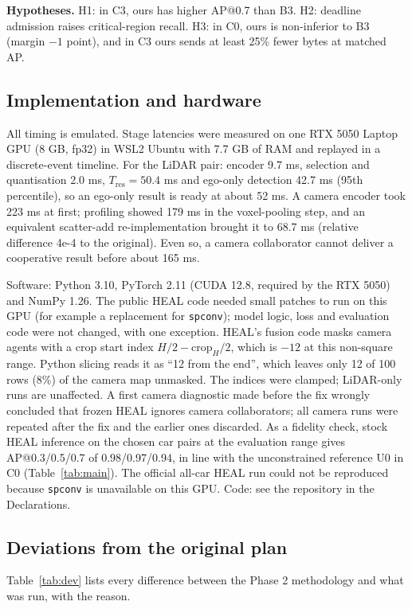 \documentclass[conference]{IEEEtran}
\begin{document}
\textbf{Hypotheses.} H1: in C3, ours has higher AP@0.7 than B3. H2: deadline admission raises critical-region recall. H3: in C0, ours is non-inferior to B3 (margin $-1$ point), and in C3 ours sends at least 25\% fewer bytes at matched AP.

\subsection{Implementation and hardware}\label{sec:timing}
All timing is emulated. Stage latencies were measured on one RTX 5050 Laptop GPU (8 GB, fp32) in WSL2 Ubuntu with 7.7 GB of RAM and replayed in a discrete-event timeline. For the LiDAR pair: encoder 9.7 ms, selection and quantisation 2.0 ms, $T_{\mathrm{res}}=50.4$ ms and ego-only detection 42.7 ms (95th percentile), so an ego-only result is ready at about 52 ms. A camera encoder took 223 ms at first; profiling showed 179 ms in the voxel-pooling step, and an equivalent scatter-add re-implementation brought it to 68.7 ms (relative difference 4e-4 to the original). Even so, a camera collaborator cannot deliver a cooperative result before about 165 ms.

Software: Python 3.10, PyTorch 2.11 (CUDA 12.8, required by the RTX 5050) and NumPy 1.26. The public HEAL code needed small patches to run on this GPU (for example a replacement for \texttt{spconv}); model logic, loss and evaluation code were not changed, with one exception. HEAL's fusion code masks camera agents with a crop start index $H/2-\text{crop}_H/2$, which is $-12$ at this non-square range. Python slicing reads it as ``12 from the end'', which leaves only 12 of 100 rows (8\%) of the camera map unmasked. The indices were clamped; LiDAR-only runs are unaffected. A first camera diagnostic made before the fix wrongly concluded that frozen HEAL ignores camera collaborators; all camera runs were repeated after the fix and the earlier ones discarded. As a fidelity check, stock HEAL inference on the chosen car pairs at the evaluation range gives AP@0.3/0.5/0.7 of 0.98/0.97/0.94, in line with the unconstrained reference U0 in C0 (Table~\ref{tab:main}). The official all-car HEAL run could not be reproduced because \texttt{spconv} is unavailable on this GPU. Code: see the repository in the Declarations.

\subsection{Deviations from the original plan}\label{sec:deviations}
Table~\ref{tab:dev} lists every difference between the Phase 2 methodology and what was run, with the reason.
\end{document}
